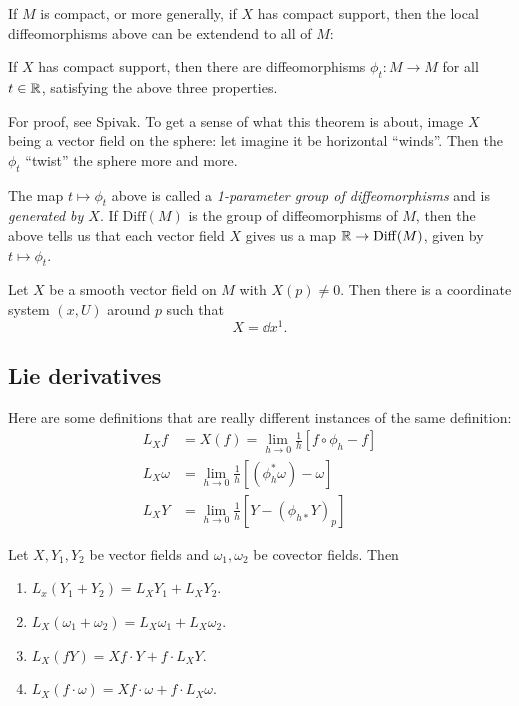 \documentclass[11pt, english]{article}
\begin{document}
If $M$ is compact, or more generally, if $X$ has compact support, then the local diffeomorphisms above can be extendend to all of $M$:

\begin{thm}
If $X$ has compact support, then there are diffeomorphisms $\phi_t:M \to M$ for all $t \in \mathbb{R}$, satisfying the above three properties.
\end{thm}

For proof, see Spivak. To get a sense of what this theorem is about, image $X$ being a vector field on the sphere: let imagine it be horizontal ``winds''. Then the $\phi_t$ ``twist'' the sphere more and more.

The map $t \mapsto \phi_t$ above is called a \emph{1-parameter group of diffeomorphisms} and is \emph{generated by $X$}. If $\mathrm{Diff}(M)$ is the group of diffeomorphisms of $M$, then the above tells us that each vector field $X$ gives us a map $\mathbb{R} \to \mathrm{Diff}(M)$, given by $t \mapsto \phi_t$. 

\begin{thm}
  Let $X$ be a smooth vector field on $M$ with $X(p) \neq 0$. Then there is a coordinate system $(x,U)$ around $p$ such that
\[
X = \dd{}{x^1}.
\]
\end{thm}

\subsection{Lie derivatives}

Here are some definitions that are really different instances of the same definition: 
\begin{align*}
  L_Xf &= X(f) = \lim_{h \to 0} \frac 1h \left[ f \circ \phi_h - f \right] \\ 
L_X \omega &= \lim_{h \to 0} \frac 1h \left[ (\phi_h^\ast \omega)-\omega \right] \\
L_XY &= \lim_{h \to 0} \frac 1h \left[ Y-(\phi_{h\ast}Y)_p \right]
\end{align*}

\begin{prop}
Let $X,Y_1,Y_2$ be vector fields and $\omega_1,\omega_2$ be covector fields. Then
\begin{enumerate}
\item $L_x(Y_1 +Y_2) = L_XY_1+L_XY_2$.
\item $L_X(\omega_1+\omega_2)=L_X\omega_1+L_X\omega_2$.
\item $L_X(fY) = Xf \cdot Y + f \cdot L_XY$.
\item $L_X(f \cdot \omega) = Xf \cdot \omega + f \cdot L_X \omega$.
\end{enumerate}
\end{prop}
\end{document}

